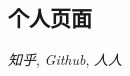 \documentclass[margin]{res}
\begin{document}
\begin{CJK}{UTF8}{gkai}
\begin{resume}
\section{个人页面}             

            {\it 知乎},      
            {\it Github},  
            {\it 人人} \\  
\end{resume}
\end{CJK}
\end{document}
